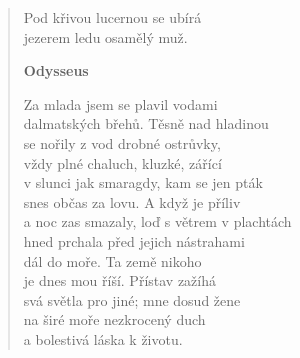 \begin{verse}
\medskip

Pod křivou lucernou se ubírá\\
jezerem ledu osamělý muž.

\bigskip

\textbf{Odysseus}

\smallskip

Za mlada jsem se plavil vodami\\
dalmatských břehů. Těsně nad hladinou\\
se nořily z vod drobné ostrůvky, \\
vždy plné chaluch, kluzké, zářící\\
v slunci jak smaragdy, kam se jen pták\\
snes občas za lovu. A když je příliv\\
a noc zas smazaly, loď s větrem v plachtách\\
hned prchala před jejich nástrahami\\
dál do moře. Ta země nikoho\\
je dnes mou říší. Přístav zažíhá\\
svá světla pro jiné; mne dosud žene\\
na širé moře nezkrocený duch\\
a bolestivá láska k životu.
\end{verse}

